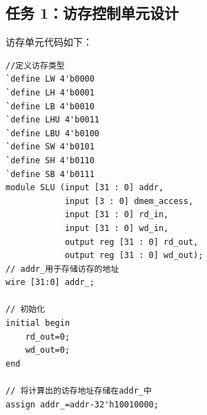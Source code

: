 \documentclass[12pt,a4paper]{ctexart}
\begin{document}
\subsection{任务 1：访存控制单元设计}
访存单元代码如下：
\begin{lstlisting}[style=verilog]
//定义访存类型
`define LW 4'b0000
`define LH 4'b0001
`define LB 4'b0010
`define LHU 4'b0011
`define LBU 4'b0100
`define SW 4'b0101
`define SH 4'b0110
`define SB 4'b0111
module SLU (input [31 : 0] addr,
            input [3 : 0] dmem_access,
            input [31 : 0] rd_in,
            input [31 : 0] wd_in,
            output reg [31 : 0] rd_out,
            output reg [31 : 0] wd_out);
// addr_用于存储访存的地址
wire [31:0] addr_;

// 初始化
initial begin
    rd_out=0;
    wd_out=0;
end

// 将计算出的访存地址存储在addr_中
assign addr_=addr-32'h10010000;


\end{lstlisting}
\end{document}
